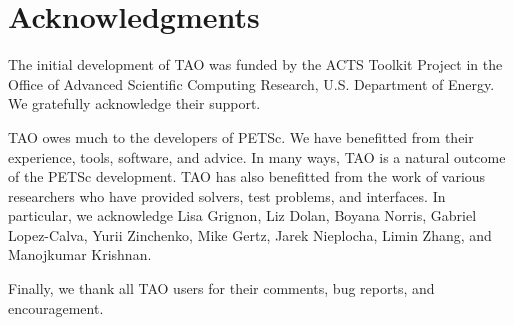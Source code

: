 %
%

\section*{Acknowledgments}

The initial development of TAO was funded by the ACTS Toolkit Project in
the Office of Advanced Scientific Computing Research, U.S. Department
of Energy. We gratefully acknowledge their support.

TAO owes much to the developers of PETSc. We have benefitted
from their experience, tools, software, and advice. In many ways, TAO is a 
natural outcome of the PETSc development.
%
TAO has also benefitted from the work of various researchers
who have provided solvers, test problems, and interfaces.
In particular, we acknowledge Lisa Grignon, Liz Dolan, Boyana Norris, 
Gabriel Lopez-Calva, Yurii Zinchenko, Mike Gertz,
Jarek Nieplocha, Limin Zhang, and Manojkumar Krishnan.

\noindent
Finally, we thank all TAO users for their comments, bug reports, and
encouragement.

